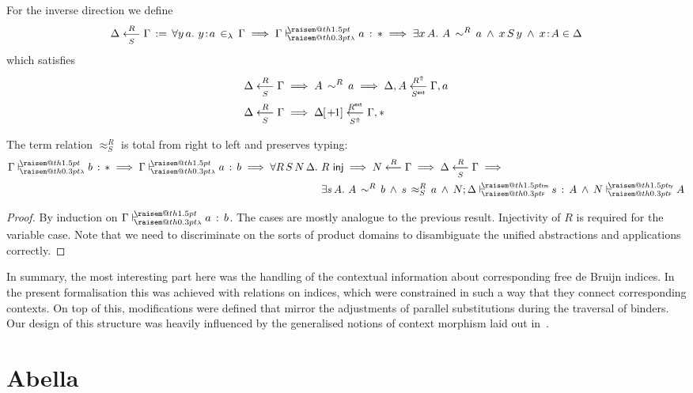 \documentclass[a4paper,UKenglish]{lipics-v2016}
\makeatletter
\newcommand{\ms}{\,}
\newcommand{\mrel}[1]{\mathrel{\ms #1 \ms}}
\newcommand{\OF}{\mrel{:}}
\newcommand{\mAnd}{\mrel{\wedge}}
\newcommand{\mAll}[1]{\ensuremath{\forall} #1.\ms\ms}
\newcommand{\mEx}[1]{\ensuremath{\exists} #1.\ms\ms}
\newcommand{\eqdef}{\mrel{:=}}
\newcommand{\SysF}{\ensuremath{\mathsf{F}}\xspace}
\newcommand{\ty}{\mathsf{ty}}
\newcommand{\tm}{\mathsf{tm}}
\newcommand{\of}{\ensuremath{\!:\!}}
\newcommand{\cc}[2]{#1;#2} %
\newcommand{\raisemath}[1]{\mathpalette{\raisem@th{#1}}}
\newcommand{\raisem@th}[3]{\raisebox{#1}{\ensuremath{#2#3}}}
\newcommand{\tsAnnot}[2]{\vdash\hspace{-.7em}^{\raisemath{1.5pt}{\scriptscriptstyle{#2}}}_{\raisemath{0.3pt}{\scriptscriptstyle{#1}}}} %
\newcommand{\tfF}{\tsAnnot{\SysF}{\ty}}  %
\newcommand{\tyF}{\tsAnnot{\SysF}{\tm}}  %
\newcommand{\istyF}[2]{\ensuremath{{#1} \mathrel{\tfF} #2}}
\newcommand{\typingF}[3]{\ensuremath{{#1} \mathrel{\tyF} #2 \OF #3}}
\newcommand{\tyL}{\tsAnnot{\lambda}{}} %
\newcommand{\typingL}[3]{\ensuremath{{#1} \mathrel{\tyL} #2 \OF #3}}
\newcommand{\inL}{\mrel{\in_{\lambda}}}
\newcommand{\tyr}{\mathrel{\sim}}
\newcommand{\tmr}{\mathrel{\approx}}
\newcommand{\Rext}[1]{\ensuremath{#1^{\mathsf{ext}}}}
\newcommand{\Rshift}[1]{\ensuremath{#1^{\Uparrow}}}
\newcommand{\tyctxrelLF}[3]{\ensuremath{#1\mathrel{\mathop{\longleftarrow}^{#2}\limits}#3}}
\newcommand{\tmctxrelLF}[4]{\ensuremath{#1\mathrel{\mathop{\longleftarrow}^{#2}_{#3}\limits}#4}}
\newcommand{\Prp}{\ensuremath{\textrm{\textasteriskcentered}}}
\newcommand{\subst}[1]{\hphantom{|}\!\![{#1}]}
\newcommand{\shift}{\ensuremath{\hspace{0.1em}\mathsf{+}\hspace{0.08em}\!1}}
\makeatother
\begin{document}
For the inverse direction we define
\begin{align*}
  \tmctxrelLF{\Delta}{R}{S}{\Gamma} \eqdef \mAll{y\,a} y \of a \inL \Gamma \implies \typingL{\Gamma}{a}{\Prp} \implies \mEx{x\,A} A\,\tyr^R\,a \mAnd x\,S\,y \mAnd x \of A \in \Delta
\end{align*}
which satisfies
\begin{align*}
  &\tmctxrelLF{\Delta}{R}{S}{\Gamma} \implies A\,\tyr^R\,a \implies \tmctxrelLF{\Delta,A}{\Rshift{R}}{\Rext{S}}{\Gamma,a}\\
  &\tmctxrelLF{\Delta}{R}{S}{\Gamma} \implies \tmctxrelLF{\Delta\subst{\shift}}{\Rext{R}}{\Rshift{S}}{\Gamma,\Prp}
\end{align*}
\begin{lemma}
  The term relation $\tmr^R_S$ is total from right to left and preserves typing:
  \begin{align*}
    \typingL{\Gamma}{b}{\Prp} \implies \typingL{\Gamma}{a}{b} \implies \mAll{R\,S\,N\,\Delta} &R\ms\ms\mathsf{inj} \implies \tyctxrelLF{N}{R}{\Gamma} \implies \tmctxrelLF{\Delta}{R}{S}{\Gamma} \implies \\
                                                                &\mEx{s\,A} A\,\tyr^R\,b \mAnd s\,\tmr^R_S\,a \mAnd \typingF{\cc{N}{\Delta}}{s}{A} \mAnd \istyF{N}{A}
  \end{align*}
\end{lemma}
\begin{proof}
  By induction on $\typingL{\Gamma}{a}{b}$.
  The cases are mostly analogue to the previous result.
  Injectivity of $R$ is required for the variable case.
  Note that we need to discriminate on the sorts of product domains to disambiguate the unified abstractions and applications correctly.
\end{proof}

In summary, the most interesting part here was the handling of the contextual information about corresponding free de Bruijn indices.
In the present formalisation this was achieved with relations on indices, which were constrained in such a way that they connect corresponding contexts.
On top of this, modifications were defined that mirror the adjustments of parallel substitutions during the traversal of binders.
Our design of this structure was heavily influenced by the generalised notions of context morphism laid out in~\cite{KaiserEtAl:2017:sysf_pts_equiv_coq}.

\section{Abella}
\label{sec:abella}
\end{document}
